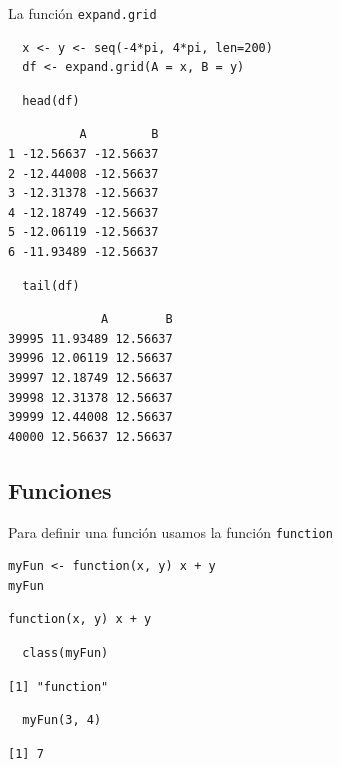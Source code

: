 \documentclass[xcolor={usenames,svgnames,dvipsnames}]{beamer}
\begin{document}
\begin{frame}[fragile,label={sec:orgheadline32}]{La función \texttt{expand.grid}}
 \lstset{language=R,label= ,caption= ,captionpos=b,numbers=none}
\begin{lstlisting}
  x <- y <- seq(-4*pi, 4*pi, len=200)
  df <- expand.grid(A = x, B = y)
\end{lstlisting}

\lstset{language=R,label= ,caption= ,captionpos=b,numbers=none}
\begin{lstlisting}
  head(df)
\end{lstlisting}

\begin{verbatim}
          A         B
1 -12.56637 -12.56637
2 -12.44008 -12.56637
3 -12.31378 -12.56637
4 -12.18749 -12.56637
5 -12.06119 -12.56637
6 -11.93489 -12.56637
\end{verbatim}

\lstset{language=R,label= ,caption= ,captionpos=b,numbers=none}
\begin{lstlisting}
  tail(df)
\end{lstlisting}

\begin{verbatim}
             A        B
39995 11.93489 12.56637
39996 12.06119 12.56637
39997 12.18749 12.56637
39998 12.31378 12.56637
39999 12.44008 12.56637
40000 12.56637 12.56637
\end{verbatim}
\end{frame}

\subsection{Funciones}
\label{sec:orgheadline37}

\begin{frame}[fragile,label={sec:orgheadline34}]{Para definir una función usamos la función \texttt{function}}
 \lstset{language=R,label= ,caption= ,captionpos=b,numbers=none}
\begin{lstlisting}
myFun <- function(x, y) x + y
myFun
\end{lstlisting}

\begin{verbatim}
function(x, y) x + y
\end{verbatim}

\lstset{language=R,label= ,caption= ,captionpos=b,numbers=none}
\begin{lstlisting}
  class(myFun)
\end{lstlisting}

\begin{verbatim}
[1] "function"
\end{verbatim}


\lstset{language=R,label= ,caption= ,captionpos=b,numbers=none}
\begin{lstlisting}
  myFun(3, 4)
\end{lstlisting}

\begin{verbatim}
[1] 7
\end{verbatim}
\end{frame}
\end{document}
